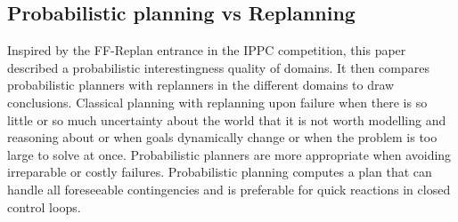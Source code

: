 \documentclass[runningheads,a4paper]{llncs}
\begin{document}

%

%




\subsection{Probabilistic planning vs Replanning}
Inspired by the FF-Replan entrance in the IPPC competition, this paper described a probabilistic interestingness quality of domains. It then compares probabilistic planners with replanners in the different domains to draw conclusions. Classical planning with replanning upon failure when there is so little or so much uncertainty about the world that it is not worth modelling and reasoning about or when goals dynamically change or when the problem is too large to solve at once. Probabilistic planners are more appropriate when avoiding irreparable or costly failures. Probabilistic planning computes a plan that can handle all foreseeable contingencies and is preferable for quick reactions in closed control loops.
\end{document}
